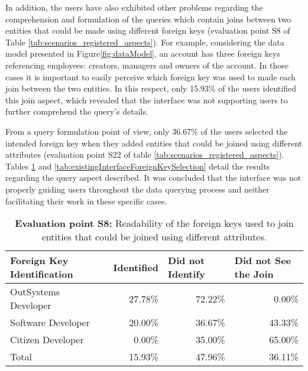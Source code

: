 In addition, the users have also exhibited other problems regarding the comprehension and formulation of the queries which contain joins between two entities that could be made using different foreign keys (evaluation point S8 of Table \ref{tab:scenarios_registered_aspects}). For example, considering the data model presented in  Figure\ref{fig:dataModel}, an account has three foreign keys referencing employees: creators, managers and owners of the account. In those cases it is important to easily perceive which foreign key was used to made each join between the two entities. In this respect, only 15.93\% of the users identified this join aspect, which revealed that the interface was not supporting users to further comprehend the query's details. 

From a query formulation point of view, only 36.67\% of the users selected the intended foreign key when they added entities that could be joined using different attributes (evaluation point S22 of table \ref{tab:scenarios_registered_aspects}). Tables \ref{tab:existingInterfaceForeignKeyIdentification} and \ref{tab:existingInterfaceForeignKeySelection} detail the results regarding the query aspect described. It was concluded that the interface was not properly guiding users throughout the data querying process and neither facilitating their work in these specific cases.

\begin{table}[tb]
    \caption{\textbf{Evaluation point S8:} Readability of the foreign keys used to join entities that could be joined using different attributes.}
    \label{tab:existingInterfaceForeignKeyIdentification}
    \begin{tabular}{@{}lrrr@{}}
    \toprule
    \textbf{Foreign Key Identification} & \multicolumn{1}{l}{Identified} & \multicolumn{1}{l}{Did not Identify} & \multicolumn{1}{l}{Did not See the Join} \\ \midrule
    OutSystems Developer                & 27.78\%                        & 72.22\%                              & 0.00\%                                   \\
    Software Developer                  & 20.00\%                        & 36.67\%                              & 43.33\%                                  \\
    Citizen Developer                   & 0.00\%                         & 35.00\%                              & 65.00\%                                  \\
    Total                               & 15.93\%                        & 47.96\%                              & 36.11\%                                  \\ \bottomrule
    \end{tabular}
    \end{table}


